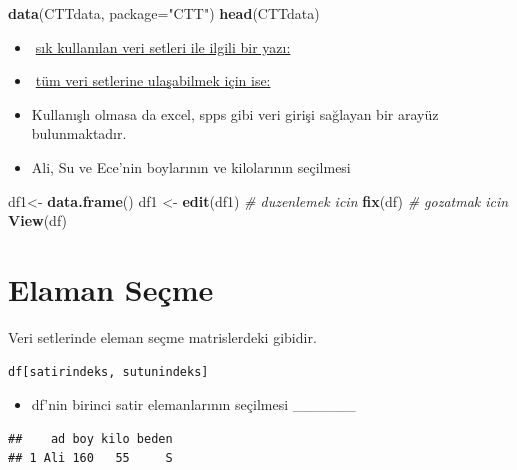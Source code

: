 \documentclass[
  oneside]{book}
\newenvironment{Shaded}{\begin{snugshade}}{\end{snugshade}}
\newcommand{\AttributeTok}[1]{\textcolor[rgb]{0.13,0.29,0.53}{#1}}
\newcommand{\CommentTok}[1]{\textcolor[rgb]{0.56,0.35,0.01}{\textit{#1}}}
\newcommand{\FunctionTok}[1]{\textcolor[rgb]{0.13,0.29,0.53}{\textbf{#1}}}
\newcommand{\NormalTok}[1]{#1}
\newcommand{\OtherTok}[1]{\textcolor[rgb]{0.56,0.35,0.01}{#1}}
\newcommand{\StringTok}[1]{\textcolor[rgb]{0.31,0.60,0.02}{#1}}
\providecommand{\tightlist}{%
  \setlength{\itemsep}{0pt}\setlength{\parskip}{0pt}}
\begin{document}
\begin{Shaded}
\begin{Highlighting}[]
\FunctionTok{data}\NormalTok{(CTTdata, }\AttributeTok{package=}\StringTok{"CTT"}\NormalTok{) }
\FunctionTok{head}\NormalTok{(CTTdata)}
\end{Highlighting}
\end{Shaded}

\begin{itemize}
\item
  🔗\href{http://r-tutorials.com/famous-useful-pre-installed-exercise-datasets-r/}{sık kullanılan veri setleri ile ilgili bir yazı:}
\item
  🔗\href{https://vincentarelbundock.github.io/Rdatasets/datasets.html}{tüm veri setlerine ulaşabilmek için ise:}
\item
  Kullanışlı olmasa da excel, spps gibi veri girişi sağlayan bir arayüz bulunmaktadır.
\item
  Ali, Su ve Ece'nin boylarının ve kilolarının seçilmesi
\end{itemize}

\begin{Shaded}
\begin{Highlighting}[]
\NormalTok{df1}\OtherTok{\textless{}{-}} \FunctionTok{data.frame}\NormalTok{() }
\NormalTok{df1 }\OtherTok{\textless{}{-}} \FunctionTok{edit}\NormalTok{(df1)}
\CommentTok{\# duzenlemek icin}
\FunctionTok{fix}\NormalTok{(df)}
\CommentTok{\# gozatmak icin }
\FunctionTok{View}\NormalTok{(df)}
\end{Highlighting}
\end{Shaded}

\hypertarget{elaman-seuxe7me}{%
\section{Elaman Seçme}\label{elaman-seuxe7me}}

Veri setlerinde eleman seçme matrislerdeki gibidir.

\texttt{df{[}satirindeks,\ sutunindeks{]}}

\begin{itemize}
\tightlist
\item
  df'nin birinci satir elemanlarının seçilmesi \_\_\_\_\_\_
\end{itemize}

\begin{verbatim}
##    ad boy kilo beden
## 1 Ali 160   55     S
\end{verbatim}
\end{document}
